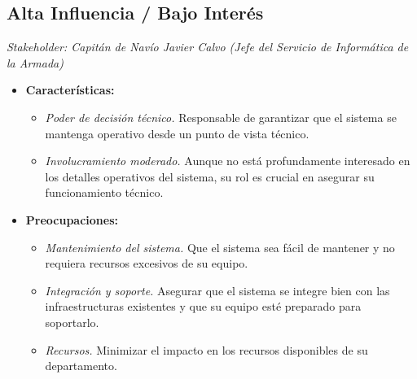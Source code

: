 \subsection{Alta Influencia / Bajo Interés} 
\textit{Stakeholder: Capitán de Navío Javier Calvo (Jefe del Servicio de Informática de la Armada)}
\begin{itemize}
    \item \textbf{Características:}
    \begin{itemize}
        \item \textit{Poder de decisión técnico.} Responsable de garantizar que el sistema se mantenga operativo desde un punto de vista técnico.
        \item \textit{Involucramiento moderado.} Aunque no está profundamente interesado en los detalles operativos del sistema, su rol es crucial en asegurar su funcionamiento técnico.
    \end{itemize}
    \item \textbf{Preocupaciones:}
    \begin{itemize}
        \item \textit{Mantenimiento del sistema.} Que el sistema sea fácil de mantener y no requiera recursos excesivos de su equipo.
        \item \textit{Integración y soporte.} Asegurar que el sistema se integre bien con las infraestructuras existentes y que su equipo esté preparado para soportarlo.
        \item \textit{Recursos.} Minimizar el impacto en los recursos disponibles de su departamento.
    \end{itemize}
\end{itemize}


